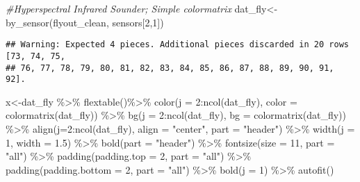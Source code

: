 \documentclass[
]{article}
\newenvironment{Shaded}{\begin{snugshade}}{\end{snugshade}}
\newcommand{\AttributeTok}[1]{\textcolor[rgb]{0.77,0.63,0.00}{#1}}
\newcommand{\CommentTok}[1]{\textcolor[rgb]{0.56,0.35,0.01}{\textit{#1}}}
\newcommand{\DecValTok}[1]{\textcolor[rgb]{0.00,0.00,0.81}{#1}}
\newcommand{\FloatTok}[1]{\textcolor[rgb]{0.00,0.00,0.81}{#1}}
\newcommand{\FunctionTok}[1]{\textcolor[rgb]{0.00,0.00,0.00}{#1}}
\newcommand{\NormalTok}[1]{#1}
\newcommand{\OtherTok}[1]{\textcolor[rgb]{0.56,0.35,0.01}{#1}}
\newcommand{\SpecialCharTok}[1]{\textcolor[rgb]{0.00,0.00,0.00}{#1}}
\newcommand{\StringTok}[1]{\textcolor[rgb]{0.31,0.60,0.02}{#1}}
\begin{document}
\begin{Shaded}
\begin{Highlighting}[]
\CommentTok{\#Hyperspectral Infrared Sounder; Simple colormatrix}
\NormalTok{dat\_fly}\OtherTok{\textless{}{-}}\FunctionTok{by\_sensor}\NormalTok{(flyout\_clean, sensors[}\DecValTok{2}\NormalTok{,}\DecValTok{1}\NormalTok{])}
\end{Highlighting}
\end{Shaded}

\begin{verbatim}
## Warning: Expected 4 pieces. Additional pieces discarded in 20 rows [73, 74, 75,
## 76, 77, 78, 79, 80, 81, 82, 83, 84, 85, 86, 87, 88, 89, 90, 91, 92].
\end{verbatim}

\begin{Shaded}
\begin{Highlighting}[]
\NormalTok{x}\OtherTok{\textless{}{-}}\NormalTok{dat\_fly }\SpecialCharTok{\%\textgreater{}\%}
    \FunctionTok{flextable}\NormalTok{()}\SpecialCharTok{\%\textgreater{}\%}
    \FunctionTok{color}\NormalTok{(}\AttributeTok{j =} \DecValTok{2}\SpecialCharTok{:}\FunctionTok{ncol}\NormalTok{(dat\_fly), }\AttributeTok{color =} \FunctionTok{colormatrix}\NormalTok{(dat\_fly)) }\SpecialCharTok{\%\textgreater{}\%}
    \FunctionTok{bg}\NormalTok{(}\AttributeTok{j =} \DecValTok{2}\SpecialCharTok{:}\FunctionTok{ncol}\NormalTok{(dat\_fly), }\AttributeTok{bg =} \FunctionTok{colormatrix}\NormalTok{(dat\_fly)) }\SpecialCharTok{\%\textgreater{}\%}
    \FunctionTok{align}\NormalTok{(}\AttributeTok{j=}\DecValTok{2}\SpecialCharTok{:}\FunctionTok{ncol}\NormalTok{(dat\_fly), }\AttributeTok{align =} \StringTok{"center"}\NormalTok{, }\AttributeTok{part =} \StringTok{"header"}\NormalTok{) }\SpecialCharTok{\%\textgreater{}\%}
    \FunctionTok{width}\NormalTok{(}\AttributeTok{j =} \DecValTok{1}\NormalTok{, }\AttributeTok{width =} \FloatTok{1.5}\NormalTok{) }\SpecialCharTok{\%\textgreater{}\%}
    \FunctionTok{bold}\NormalTok{(}\AttributeTok{part =} \StringTok{"header"}\NormalTok{) }\SpecialCharTok{\%\textgreater{}\%}
    \FunctionTok{fontsize}\NormalTok{(}\AttributeTok{size =} \DecValTok{11}\NormalTok{, }\AttributeTok{part =} \StringTok{"all"}\NormalTok{) }\SpecialCharTok{\%\textgreater{}\%}
    \FunctionTok{padding}\NormalTok{(}\AttributeTok{padding.top =} \DecValTok{2}\NormalTok{, }\AttributeTok{part =} \StringTok{"all"}\NormalTok{) }\SpecialCharTok{\%\textgreater{}\%}
    \FunctionTok{padding}\NormalTok{(}\AttributeTok{padding.bottom =} \DecValTok{2}\NormalTok{, }\AttributeTok{part =} \StringTok{"all"}\NormalTok{) }\SpecialCharTok{\%\textgreater{}\%}
    \FunctionTok{bold}\NormalTok{(}\AttributeTok{j =} \DecValTok{1}\NormalTok{) }\SpecialCharTok{\%\textgreater{}\%} \FunctionTok{autofit}\NormalTok{()}
\end{Highlighting}
\end{Shaded}
\end{document}
